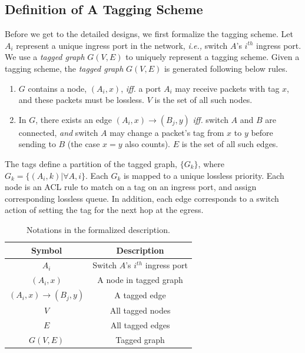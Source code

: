 \subsection{Definition of A Tagging Scheme}

Before we get to the detailed designs, we first formalize the tagging scheme.
Let $A_i$ represent a unique ingress port in the network, {\em i.e.,} switch $A$'s $i^{th}$ ingress port.
We use a {\em tagged graph} $G(V,E)$ to uniquely represent a tagging scheme.
Given a tagging scheme, the {\em tagged graph} $G(V,E)$ is generated following below rules.

\begin{enumerate}
\item $G$ contains a node, $(A_i, x)$, {\em iff.} a port $A_i$ may receive packets with tag $x$, and these packets must 
be lossless. $V$ is the set of all such nodes.
\item In $G$, there exists an edge $(A_i, x)\rightarrow(B_j, y)$ {\em iff.} switch $A$ and $B$ are 
connected, {\em and} switch $A$ may change a packet's tag from $x$ to $y$ before sending to $B$ (the case $x=y$ also counts).
$E$ is the set of all such edges.
\end{enumerate}

The tags define a partition of the tagged graph, $\{G_k\}$, where $G_k = \{(A_i,
k) | \forall A, i\}$. Each $G_k$ is mapped to a unique
lossless priority.  Each node is an ACL rule to match on a tag on an ingress port, and
assign corresponding lossless queue.  In addition, each edge corresponds 
to a switch action of setting the tag for the next hop at the egress.

\begin{table}
\small
\centering
\begin{tabular}{|c|c|}
\hline
Symbol & Description \\ \hline
$A_i$ & Switch $A$'s $i^{th}$ ingress port  \\ \hline
$(A_i, x)$ & A node in tagged graph \\ \hline
$(A_i, x)\rightarrow(B_j, y)$ & A tagged edge \\ \hline
$V$ & All tagged nodes  \\ \hline
$E$ & All tagged edges \\ \hline
$G(V, E)$ & Tagged graph \\ \hline
\end{tabular}
\caption{Notations in the formalized description.}
\label{tab:symbols}
\end{table}

